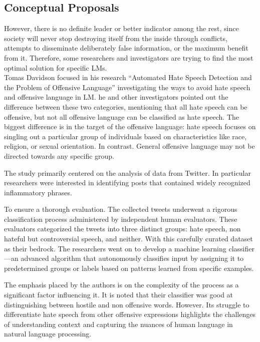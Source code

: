 \subsection{Conceptual Proposals}
However, there is no definite leader or better indicator among the rest, since society will never stop destroying itself from the inside through conflicts, attempts to disseminate deliberately false information, or the maximum benefit from it. Therefore, some researchers and investigators are trying to find the most optimal solution for specific LMs.  \\
Tomas Davidson focused in his research “Automated Hate Speech Detection and the Problem of Offensive Language” investigating the ways to avoid hate speech and offensive language in LM. he and other investigators pointed out the difference between these two categories, mentioning that all hate speech can be offensive, but not all offensive language can be classified as hate speech. The biggest difference is in the target of the offensive language: hate speech focuses on singling out a particular group of individuals based on characteristics like race, religion, or sexual orientation. In contrast. General offensive language may not be directed towards any specific group.

The study primarily centered on the analysis of data from Twitter. In particular researchers were interested in identifying posts that contained widely recognized inflammatory phrases. 

To ensure a thorough evaluation. The collected tweets underwent a rigorous classification process administered by independent human evaluators. These evaluators categorized the tweets into three distinct groups: hate speech, non hateful but controversial speech, and neither. With this carefully curated dataset as their bedrock. The researchers went on to develop a machine learning classifier—an advanced algorithm that autonomously classifies input by assigning it to predetermined groups or labels based on patterns learned from specific examples.


The emphasis placed by the authors is on the complexity of the process as a significant factor influencing it. It is noted that their classifier was good at distinguishing between hostile and non offensive words. However. Its struggle to differentiate hate speech from other offensive expressions highlights the challenges of understanding context and capturing the nuances of human language in natural language processing.
\cite{tdd2017}\\

